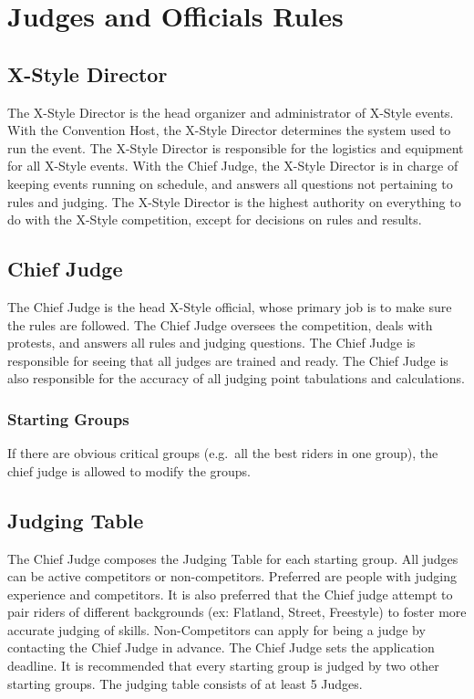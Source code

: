 \chapter{Judges and Officials Rules}

\section{X-Style Director}

The X-Style Director is the head organizer and administrator of X-Style events.
With the Convention Host, the X-Style Director determines the system used to run the event.
The X-Style Director is responsible for the logistics and equipment for all X-Style events.
With the Chief Judge, the X-Style Director is in charge of keeping events running on schedule, and answers all questions not pertaining to rules and judging.
The X-Style Director is the highest authority on everything to do with the X-Style competition, except for decisions on rules and results.

\section{Chief Judge}

The Chief Judge is the head X-Style official, whose primary job is to make sure the rules are followed.
The Chief Judge oversees the competition, deals with protests, and answers all rules and judging questions.
The Chief Judge is responsible for seeing that all judges are trained and ready.
The Chief Judge is also responsible for the accuracy of all judging point tabulations and calculations.

\subsection{Starting Groups}
If there are obvious critical groups (e.g.\ all the best riders in one group), the chief judge is allowed to modify the groups.

\section{Judging Table}

The Chief Judge composes the Judging Table for each starting group.
All judges can be active competitors or non-competitors.
Preferred are people with judging experience and competitors.
It is also preferred that the Chief judge attempt to pair riders of different backgrounds (ex: Flatland, Street, Freestyle) to foster more accurate judging of skills.
Non-Competitors can apply for being a judge by contacting the Chief Judge in advance.
The Chief Judge sets the application deadline.
It is recommended that every starting group is judged by two other starting groups.
The judging table consists of at least 5 Judges.

